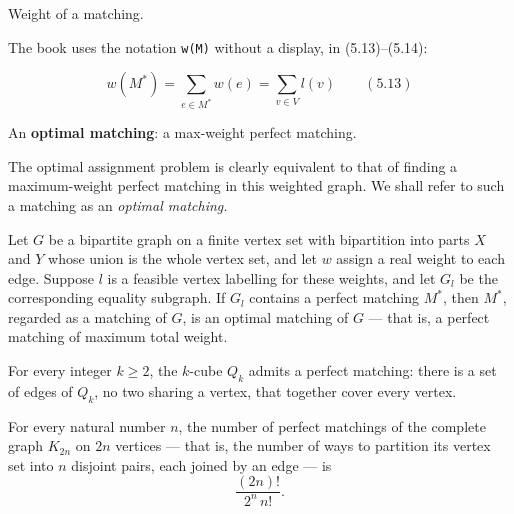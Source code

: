 \begin{definition}
\label{SimpleGraph.matchingWeight}
\leanok
Weight of a matching.

The book uses the notation \texttt{w(M)} without a display, in (5.13)--(5.14):

\[w(M^*) = \sum_{e \in M^*} w(e) = \sum_{v \in V} l(v) \qquad (5.13)\]
\end{definition}

\begin{definition}
\label{SimpleGraph.IsOptimalMatching}
\leanok
{}
An \textbf{optimal matching}: a max-weight perfect matching.

The optimal assignment problem is clearly equivalent to that of finding a maximum-weight
perfect matching in this weighted graph. We shall refer to such a matching as an
\emph{optimal matching.}
\end{definition}

\begin{theorem}
\label{SimpleGraph.optimal_of_perfectMatching_equalitySubgraph}
Let $G$ be a bipartite graph on a finite vertex set with bipartition into parts $X$ and
$Y$ whose union is the whole vertex set, and let $w$ assign a real weight to each edge.
Suppose $l$ is a feasible vertex labelling for these weights, and let $G_l$ be the
corresponding equality subgraph. If $G_l$ contains a perfect matching $M^*$, then $M^*$,
regarded as a matching of $G$, is an optimal matching of $G$ — that is, a perfect
matching of maximum total weight.
\end{theorem}

\begin{theorem}
\label{SimpleGraph.cube_isPerfectMatching}
For every integer $k \ge 2$, the $k$-cube $Q_k$ admits a perfect matching: there is a
set of edges of $Q_k$, no two sharing a vertex, that together cover every vertex.
\end{theorem}

\begin{theorem}
\label{SimpleGraph.card_perfectMatching_completeGraph}
For every natural number $n$, the number of perfect matchings of the complete graph
$K_{2n}$ on $2n$ vertices — that is, the number of ways to partition its vertex set into
$n$ disjoint pairs, each joined by an edge — is
\[
\frac{(2n)!}{2^{n}\,n!}.
\]
\end{theorem}

